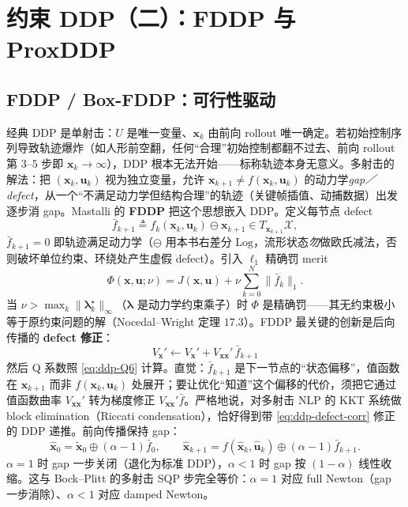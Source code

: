 \section{约束 DDP（二）：FDDP 与 ProxDDP}
\label{sec:ddp-fddp}

\subsection{FDDP / Box-FDDP：可行性驱动}
\label{sec:ddp-fddp-core}

经典 DDP 是单射击：$U$ 是唯一变量、$\mathbf{x}_k$ 由前向 rollout 唯一确定。若初始控制序列导致轨迹爆炸（如人形前空翻，任何“合理”初始控制都翻不过去、前向 rollout 第 $3$--$5$ 步即 $\mathbf{x}_k\to\infty$），DDP 根本无法开始——标称轨迹本身无意义。多射击的解法：把 $(\mathbf{x}_k,\mathbf{u}_k)$ 视为独立变量，允许 $\mathbf{x}_{k+1}\neq f(\mathbf{x}_k,\mathbf{u}_k)$ 的动力学\emph{gap／defect}，从一个“不满足动力学但结构合理”的轨迹（关键帧插值、动捕数据）出发逐步消 gap。Mastalli 的 \textbf{FDDP} 把这个思想嵌入 DDP\cite{mastalli2020crocoddyl}。定义每节点 defect
\begin{equation}
  \bar f_{k+1}\triangleq f_k(\mathbf{x}_k,\mathbf{u}_k)\ominus\mathbf{x}_{k+1}\in T_{\mathbf{x}_{k+1}}\mathcal{X},
  \label{eq:ddp-defect}
\end{equation}
$\bar f_{k+1}=0$ 即轨迹满足动力学（$\ominus$ 用本书右差分 $\mathrm{Log}$，流形状态\emph{勿}做欧氏减法，否则破坏单位约束、环绕处产生虚假 defect）。引入 $\ell_1$ 精确罚 merit
\begin{equation}
  \Phi(\mathbf{x},\mathbf{u};\nu)=J(\mathbf{x},\mathbf{u})+\nu\sum_{k=0}^{N}\|\bar f_k\|_1.
  \label{eq:ddp-merit}
\end{equation}
当 $\nu>\max_k\|\boldsymbol{\lambda}_k^\star\|_\infty$（$\boldsymbol{\lambda}$ 是动力学约束乘子）时 $\Phi$ 是精确罚——其无约束极小等于原约束问题的解（Nocedal--Wright 定理 $17.3$\cite{nocedal2006numerical}）。FDDP 最关键的创新是后向传播的 \textbf{defect 修正}：
\begin{equation}
  \boxed{\;V_{\mathbf{x}}'\leftarrow V_{\mathbf{x}}'+V_{\mathbf{xx}}'\,\bar f_{k+1}\;}
  \label{eq:ddp-defect-corr}
\end{equation}
然后 Q 系数照 \cref{eq:ddp-Q6} 计算。直觉：$\bar f_{k+1}$ 是下一节点的“状态偏移”，值函数在 $\mathbf{x}_{k+1}$ 而非 $f(\mathbf{x}_k,\mathbf{u}_k)$ 处展开；要让优化“知道”这个偏移的代价，须把它通过值函数曲率 $V_{\mathbf{xx}}'$ 转为梯度修正 $V_{\mathbf{xx}}'\bar f$。严格地说，对多射击 NLP 的 KKT 系统做 block elimination（Riccati condensation），恰好得到带 \cref{eq:ddp-defect-corr} 修正的 DDP 递推。前向传播保持 gap：
\begin{equation}
  \hat{\mathbf{x}}_0=\tilde{\mathbf{x}}_0\oplus(\alpha-1)\bar f_0,\qquad \hat{\mathbf{x}}_{k+1}=f(\hat{\mathbf{x}}_k,\hat{\mathbf{u}}_k)\oplus(\alpha-1)\bar f_{k+1}.
  \label{eq:ddp-fddp-forward}
\end{equation}
$\alpha=1$ 时 gap 一步关闭（退化为标准 DDP），$\alpha<1$ 时 gap 按 $(1-\alpha)$ 线性收缩。这与 Bock--Plitt 的多射击 SQP 步完全等价：$\alpha=1$ 对应 full Newton（gap 一步消除）、$\alpha<1$ 对应 damped Newton。

